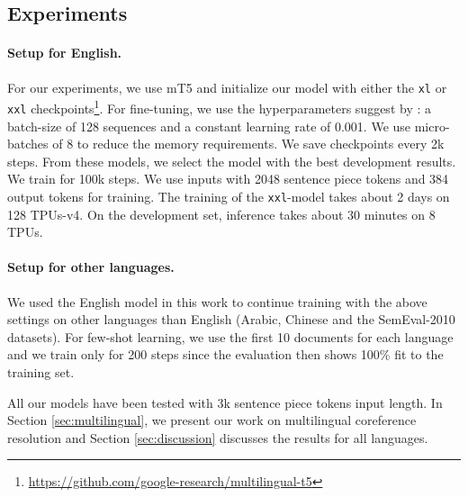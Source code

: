 \documentclass[11pt,a4paper]{article}
\begin{document}
\subsection{Experiments}
\label{experiments}

\paragraph{Setup for English.}
For our experiments, we use mT5 and initialize our model with either the {\tt xl} or {\tt xxl} checkpoints\footnote{\url{https://github.com/google-research/multilingual-t5}}. For fine-tuning, we use the hyperparameters suggest by : a batch-size of 128 sequences and a constant learning rate of 0.001. We use micro-batches of 8 to reduce the memory requirements. We save checkpoints every 2k steps. From these models, we select the model with the best development results. We train for 100k steps. We use inputs with 2048 sentence piece tokens and 384 output tokens for training. The training of the {\tt xxl}-model takes about 2 days on 128 TPUs-v4. 
On the development set, inference takes about 30 minutes on 8 TPUs.   

\paragraph{Setup for other languages.} We used the English model in this work to continue training with the above settings on other languages than English (Arabic, Chinese and the SemEval-2010 datasets). 
For few-shot learning, we use the first 10 documents for each language and we train only for 200 steps since the evaluation then shows 100\% fit to the training set.

All our models have been tested with 3k sentence piece tokens input length. In Section \ref{sec:multilingual}, we present our work on multilingual coreference resolution and Section \ref{sec:discussion} discusses the results for all languages.


 
\end{document}
